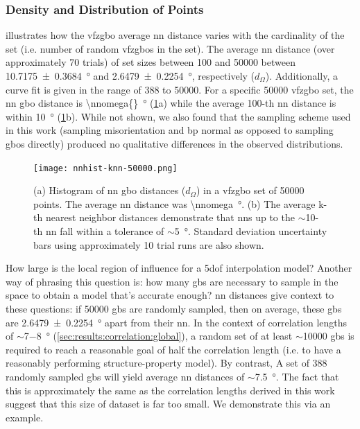 \documentclass[final,twocolumn,12pt]{elsarticle}
\begin{document}
	\subsubsection{Density and Distribution of Points} \label{sec:results:density}
	
	 illustrates how the \gls{vfzgbo} average \gls{nn} distance varies with the cardinality of the set (i.e. number of random \glspl{vfzgbo} in the set). The average \gls{nn} distance (over approximately 70 trials) of set sizes between \num{100} and \num{50000} between \SI{10.7175 \pm 0.3684}{\degree} and \SI{2.6479 \pm 0.2254}{\degree}, respectively ($d_{\Omega}$). Additionally, a curve fit is given in the range of \num{388} to \num{50000}. For a specific \num{50000} \gls{vfzgbo} set, the \gls{nn} \gls{gbo} distance is \SI{\nnomega{}}{\degree} (\cref{fig:nnhist-knn-50000}a) while the average 100-th \gls{nn} distance is within \SI{10}{\degree} (\cref{fig:nnhist-knn-50000}b). While not shown, we also found that the sampling scheme used in this work (sampling misorientation and \gls{bp} normal as opposed to sampling \glspl{gbo} directly) produced no qualitative differences in the observed distributions.
	
	\begin{figure}
		\centering
		\texttt{[image: nnhist-knn-50000.png]}
		\caption{(a) Histogram of \gls{nn} \gls{gbo} distances ($d_{\Omega}$) in a \gls{vfzgbo} set of \num{50000} points. The average \gls{nn} distance was \SI{\nnomega}{\degree}. (b) The average k-th nearest neighbor distances demonstrate that \glspl{nn} up to the $\sim$\num{10}-th \gls{nn} fall within a tolerance of $\sim$\SI{5}{\degree}. Standard deviation uncertainty bars using approximately 10 trial runs are also shown. }
		\label{fig:nnhist-knn-50000}
	\end{figure}
	
	How large is the local region of influence for a \gls{5dof} interpolation model? Another way of phrasing this question is: how many \glspl{gb} are necessary to sample in the space to obtain a model that's accurate enough? \Gls{nn} distances give context to these questions: if \num{50000} \glspl{gb} are randomly sampled, then on average, these \glspl{gb} are \SI{2.6479 \pm 0.2254}{\degree} apart from their \gls{nn}. In the context of correlation lengths of $\sim$\num{7}$-$\SI{8}{\degree} (\cref{sec:results:correlation:global}), a random set of at least $\sim$\num{10000} \glspl{gb} is required to reach a reasonable goal of half the correlation length (i.e. to have a reasonably performing structure-property model). By contrast, A set of \num{388} randomly sampled \glspl{gb} will yield average \gls{nn} distances of $\sim$\SI{7.5}{\degree}. The fact that this is approximately the same as the correlation lengths derived in this work suggest that this size of dataset is far too small. We demonstrate this via an example.
	
\end{document}
